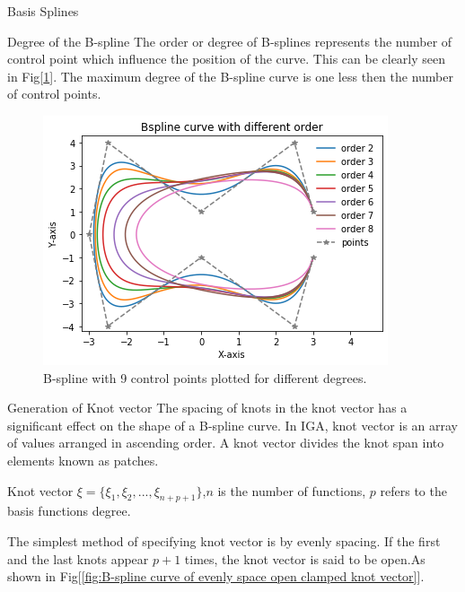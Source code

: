 \documentclass[a4paper,12pt,times]{article}
\begin{document}
\begin{section}{Basis Splines}
\begin{subsection}{Degree of the B-spline}
The order or degree of B-splines represents the number of control point which influence the position of the curve. This can be clearly seen in  Fig[\ref{fig:B-spline for various degrees}]. The maximum degree of the B-spline curve is one less then the number of control points.

\begin{figure}[h!]
\centering
\includegraphics[width=0.9\linewidth]{Bspline_curve_different_order.png}
\caption{B-spline with 9 control points plotted for different degrees.}
\label{fig:B-spline for various degrees}
\end{figure}

\end{subsection}

\begin{subsection}{Generation of Knot vector}
The spacing of knots in the knot vector has a significant effect on the shape of a B-spline curve. In IGA, knot vector is an array of values arranged in ascending order. A knot vector divides the knot span into elements known as patches.


Knot vector ${\displaystyle \xi =\{\xi _{1},\xi _{2},...,\xi _{n+p+1}\}}$,${\displaystyle n}$ is the number of functions, ${\displaystyle p}$ refers to the basis functions degree.

The simplest method of specifying knot vector is by evenly spacing. If the first and the last knots appear ${\displaystyle p+1}$ times, the knot vector is said to be open.As shown in Fig[\ref{fig:B-spline curve of evenly space open clamped knot vector}].



\end{subsection}
\end{section}
\end{document}
